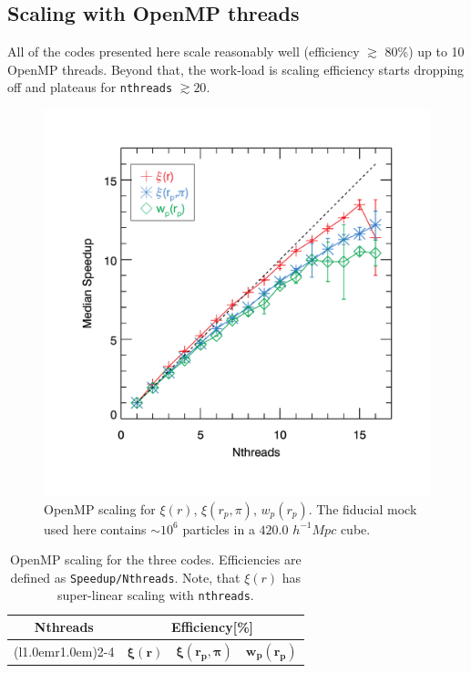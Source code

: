 \documentclass[12pt,titlepage]{article}
\newcommand{\xir}{\ensuremath{{\xi(r)}}\xspace}
\newcommand{\wprp}{\ensuremath{{w_p(r_p)}}\xspace}
\newcommand{\xirppi}{\ensuremath{{\xi(r_p,\pi)}}\xspace}
\newcommand{\hMpc}{\ensuremath{{h^{-1}Mpc}}\xspace}
\begin{document}
\subsection{Scaling with OpenMP threads}
All of the codes presented here scale reasonably well (efficiency $\gtrsim$ 80\%) up to 10 OpenMP threads. Beyond that, the work-load is 
scaling efficiency starts dropping off and plateaus for \texttt{nthreads} $\gtrsim 20$. 
\begin{figure}[htbp]
\includegraphics[clip=true,width=\linewidth]{timings_Mr19_openmp}%
\caption{OpenMP scaling for \xir, \xirppi, \wprp. The fiducial mock used here contains $\sim 10^6$ particles 
in a $420.0$ \hMpc cube. }
\label{fig:scaling_openmp}
\end{figure}

\begin{table}
\centering
\caption{\footnotesize OpenMP scaling for the three codes. Efficiencies are defined 
as \texttt{Speedup/Nthreads}. Note, that \xir has super-linear scaling with \texttt{nthreads}.}
\begin{adjustbox}{max width=\textwidth}
\begin{tabular}{cccc} 
\toprule
\multirow{2}{*}{\textbf{Nthreads}}   &
\multicolumn{3}{c}{\textbf{Efficiency[\%]}} \\
\cmidrule(l{1.0em}r{1.0em}){2-4}
&
\multicolumn{1}{c}{$\boldsymbol{\xir}$}   &
\multicolumn{1}{c}{$\boldsymbol{\xirppi}$} &
\multicolumn{1}{c}{$\boldsymbol{\wprp}$}     \\
\midrule
 
\bottomrule
\end{tabular}
\end{adjustbox}
\label{table:openmp}
\end{table}
\end{document}
